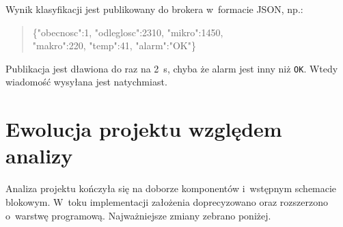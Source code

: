 \documentclass[11pt,a4paper]{article}
\begin{document}
Wynik klasyfikacji jest publikowany do brokera w~formacie JSON, np.:

\begin{quote}
\footnotesize\ttfamily
\{"obecnosc":1, "odleglosc":2310, "mikro":1450,\\ "makro":220, "temp":41, "alarm":"OK"\}
\end{quote}

Publikacja jest d\l awiona do raz na 2~s, chyba \.ze alarm jest inny ni\.z
\texttt{OK}. Wtedy wiadomo\'s\'c wysy\l ana jest natychmiast.

\section{Ewolucja projektu wzgl\k edem analizy}

Analiza projektu ko\'nczy\l a si\k e na doborze komponent\'ow i~wst\k epnym schemacie
blokowym. W~toku implementacji za\l o\.zenia doprecyzowano oraz rozszerzono
o~warstw\k e programow\k a. Najwa\.zniejsze zmiany zebrano poni\.zej.
\end{document}
